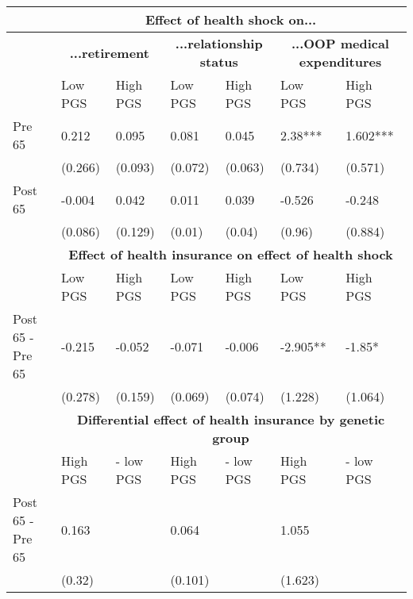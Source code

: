 % 
\begin{tabular}{l| p{2.5cm}p{2.5cm}| p{2.5cm}p{2.5cm}| p{2.5cm}p{2.5cm}}
  & \multicolumn{6}{c}{\textbf{Effect of health shock on...}} \\
 \toprule
  & \multicolumn{2}{c}{ \textbf{...retirement}} &  \multicolumn{2}{c}{ \textbf{...relationship status}} &  \multicolumn{2}{c}{ \textbf{...OOP medical expenditures}}  \\
 \midrule
 & Low PGS & High PGS & Low PGS & High PGS & Low PGS & High PGS \\ 
   \midrule
Pre 65 & 0.212 & 0.095 & 0.081 & 0.045 & 2.38*** & 1.602*** \\ 
   & (0.266) & (0.093) & (0.072) & (0.063) & (0.734) & (0.571) \\ 
  Post 65 & -0.004 & 0.042 & 0.011 & 0.039 & -0.526 & -0.248 \\ 
   & (0.086) & (0.129) & (0.01) & (0.04) & (0.96) & (0.884) \\ 
   \toprule & \multicolumn{6}{c}{ \textbf{Effect of health insurance on effect of health shock}} \\
 \midrule
 & Low PGS & High PGS & Low PGS & High PGS & Low PGS & High PGS \\ 
   \midrule
Post 65 - Pre 65 & -0.215 & -0.052 & -0.071 & -0.006 & -2.905** & -1.85* \\ 
   & (0.278) & (0.159) & (0.069) & (0.074) & (1.228) & (1.064) \\ 
   \toprule & \multicolumn{6}{c}{ \textbf{Differential effect of health insurance by genetic group}} \\
 \midrule
 & High PGS  & - low PGS & High PGS  & - low PGS & High PGS  & - low PGS \\ 
   \midrule
Post 65 - Pre 65 & 0.163 &  & 0.064 &  & 1.055 &  \\ 
   & (0.32) &  & (0.101) &  & (1.623) &  \\ 
  \end{tabular}
